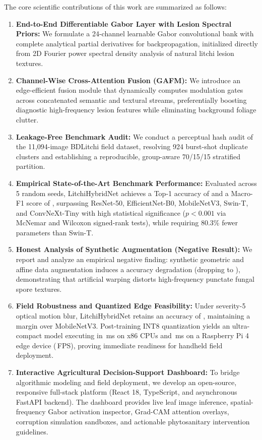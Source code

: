 The core scientific contributions of this work are summarized as follows:
\begin{enumerate}
    \item \textbf{End-to-End Differentiable Gabor Layer with Lesion Spectral Priors:} We formulate a 24-channel learnable Gabor convolutional bank with complete analytical partial derivatives for backpropagation, initialized directly from 2D Fourier power spectral density analysis of natural litchi lesion textures.
    \item \textbf{Channel-Wise Cross-Attention Fusion (GAFM):} We introduce an edge-efficient fusion module that dynamically computes modulation gates across concatenated semantic and textural streams, preferentially boosting diagnostic high-frequency lesion features while eliminating background foliage clutter.
    \item \textbf{Leakage-Free Benchmark Audit:} We conduct a perceptual hash audit of the 11,094-image BDLitchi field dataset, resolving 924 burst-shot duplicate clusters and establishing a reproducible, group-aware 70/15/15 stratified partition.
    \item \textbf{Empirical State-of-the-Art Benchmark Performance:} Evaluated across 5 random seeds, LitchiHybridNet achieves a Top-1 accuracy of \accMain{} and a Macro-F1 score of \fOneMain{}, surpassing ResNet-50, EfficientNet-B0, MobileNetV3, Swin-T, and ConvNeXt-Tiny with high statistical significance ($p < 0.001$ via McNemar and Wilcoxon signed-rank tests), while requiring 80.3\% fewer parameters than Swin-T.
    \item \textbf{Honest Analysis of Synthetic Augmentation (Negative Result):} We report and analyze an empirical negative finding: synthetic geometric and affine data augmentation induces a \deltaAcc{} accuracy degradation (dropping to \accAug{}), demonstrating that artificial warping distorts high-frequency punctate fungal spore textures.
    \item \textbf{Field Robustness and Quantized Edge Feasibility:} Under severity-5 optical motion blur, LitchiHybridNet retains an accuracy of \blurRetentionProposed{}, maintaining a \robustnessGain{} margin over MobileNetV3. Post-training INT8 quantization yields an ultra-compact \modelSizeQuantMB{} model executing in \cpuLatencyMS{}\,ms on x86 CPUs and \rpiLatencyMS{}\,ms on a Raspberry Pi 4 edge device (\rpiFPS{}\,FPS), proving immediate readiness for handheld field deployment.
    \item \textbf{Interactive Agricultural Decision-Support Dashboard:} To bridge algorithmic modeling and field deployment, we develop an open-source, responsive full-stack platform (React 18, TypeScript, and asynchronous FastAPI backend). The dashboard provides live leaf image inference, spatial-frequency Gabor activation inspector, Grad-CAM attention overlays, corruption simulation sandboxes, and actionable phytosanitary intervention guidelines.
\end{enumerate}

